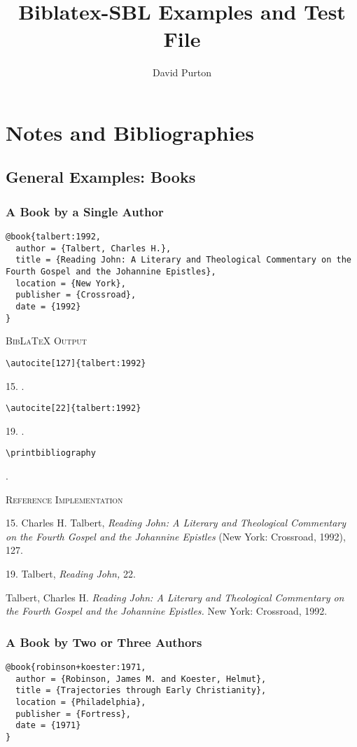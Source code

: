 \documentclass[a4paper]{article}
\newcommand\citetest[5]{%
  {\textsc{BibLaTeX Output}\par
   \nobreak
   \texttt{\textbackslash autocite[#2]\{#5\}}\par
   \color{biblatex-colour}
   #1. \cite[#2]{#5}.\par
   \color{black}
   \texttt{\textbackslash autocite[#4]\{#5\}}\par
   \color{biblatex-colour}
   #3. \cite[#4]{#5}.\par
   \color{black}
   \texttt{\textbackslash printbibliography}\par
   \color{biblatex-colour}
   \hangindent\bibindent\bibentrycite{#5}.\par}}
\newenvironment{refimp}{%
  \begin{minipage}{\linewidth}
    \setlength{\parskip}{1ex}
    \textsc{Reference Implementation}\par
    \nobreak
    \color{reference-colour}
}{\end{minipage}}
\begin{document}
\title{Biblatex-SBL Examples and Test File}
\author{David Purton}
\maketitle

\tableofcontents

\setcounter{section}{5}

\section{Notes and Bibliographies}

\setcounter{subsection}{1}
\subsection{General Examples: Books}

\subsubsection{A Book by a Single Author}

\begin{lstlisting}
@book{talbert:1992,
  author = {Talbert, Charles H.},
  title = {Reading John: A Literary and Theological Commentary on the Fourth Gospel and the Johannine Epistles},
  location = {New York},
  publisher = {Crossroad},
  date = {1992}
}
\end{lstlisting}

\citetest{15}{127}{19}{22}{talbert:1992}


\begin{refimp}
  15. Charles H. Talbert, \emph{Reading John: A Literary and Theological
  Commentary on the Fourth Gospel and the Johannine Epistles} (New York:
  Crossroad, 1992), 127.

  19. Talbert, \emph{Reading John,} 22.

  \hangindent\bibindent Talbert, Charles H. \emph{Reading John: A Literary and
  Theological Commentary on the Fourth Gospel and the Johannine Epistles.} New
  York: Crossroad, 1992.
\end{refimp}

\subsubsection{A Book by Two or Three Authors}

\begin{lstlisting}
@book{robinson+koester:1971,
  author = {Robinson, James M. and Koester, Helmut},
  title = {Trajectories through Early Christianity},
  location = {Philadelphia},
  publisher = {Fortress},
  date = {1971}
}
\end{lstlisting}  
\end{document}
